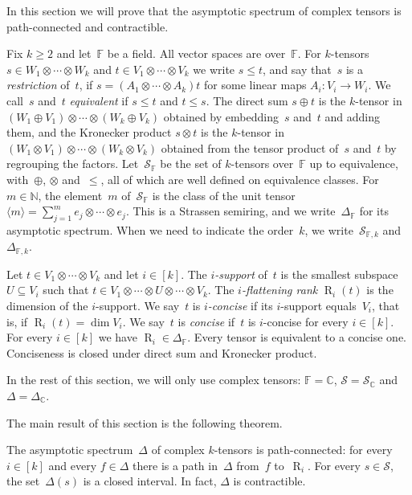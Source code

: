 \documentclass[11pt,letterpaper]{article}
\DeclareMathOperator{\tensorrank}{R}
\newcommand{\FF}{\mathbb{F}}
\newcommand{\CC}{\mathbb{C}}
\newcommand{\NN}{\mathbb{N}}
\begin{document}
In this section we will prove that the asymptotic spectrum of complex tensors is path-connected and contractible.

Fix $k \geq 2$ and let~$\FF$ be a field. All vector spaces are over~$\FF$. For $k$-tensors $s \in W_1 \otimes \cdots \otimes W_k$ and $t \in V_1 \otimes \cdots \otimes V_k$ we write $s \leq t$, and say that~$s$ is a \emph{restriction} of~$t$, if $s = (A_1 \otimes \cdots \otimes A_k)t$ for some linear maps $A_i : V_i \to W_i$. We call~$s$ and~$t$ \emph{equivalent} if $s \leq t$ and $t \leq s$. The direct sum $s \oplus t$ is the $k$-tensor in $(W_1 \oplus V_1) \otimes \cdots \otimes (W_k \oplus V_k)$ obtained by embedding~$s$ and~$t$ and adding them, and the Kronecker product $s \otimes t$ is the $k$-tensor in $(W_1 \otimes V_1) \otimes \cdots \otimes (W_k \otimes V_k)$ obtained from the tensor product of~$s$ and~$t$ by regrouping the factors. Let~$\mathcal{S}_\FF$ be the set of $k$-tensors over~$\FF$ up to equivalence, with~$\oplus$, $\otimes$ and~$\leq$, all of which are well defined on equivalence classes. For $m \in \NN$, the element~$m$ of~$\mathcal{S}_\FF$ is the class of the unit tensor $\langle m \rangle = \sum_{j=1}^m e_j \otimes \cdots \otimes e_j$. This is a Strassen semiring, and we write~$\Delta_\FF$ for its asymptotic spectrum. When we need to indicate the order~$k$, we write~$\mathcal{S}_{\FF,k}$ and~$\Delta_{\FF,k}$.

Let $t \in V_1 \otimes \cdots \otimes V_k$ and let $i \in [k]$. The \emph{$i$-support} of~$t$ is the smallest subspace $U \subseteq V_i$ such that $t \in V_1 \otimes \cdots \otimes U \otimes \cdots \otimes V_k$. The \emph{$i$-flattening rank} $\tensorrank_i(t)$ is the dimension of the $i$-support. We say~$t$ is \emph{$i$-concise} if its $i$-support equals~$V_i$, that is, if $\tensorrank_i(t) = \dim V_i$. We say~$t$ is \emph{concise} if~$t$ is $i$-concise for every $i \in [k]$. For every $i \in [k]$ we have $\tensorrank_i \in \Delta_\FF$. Every tensor is equivalent to a concise one. Conciseness is closed under direct sum and Kronecker product.

In the rest of this section, we will only use complex tensors: $\FF = \CC$,  $\mathcal{S} = \mathcal{S}_\CC$ and $\Delta = \Delta_\CC$. 

The main result of this section is the following theorem.

\begin{theorem}\label{th:tensor-contractible}
The asymptotic spectrum~$\Delta$ of complex $k$-tensors is path-connected: for every $i \in [k]$ and every $f \in \Delta$ there is a path in~$\Delta$ from~$f$ to~$\tensorrank_i$. For every $s \in \mathcal{S}$, the set~$\Delta(s)$ is a closed interval. In fact, $\Delta$ is contractible.
\end{theorem}
\end{document}
